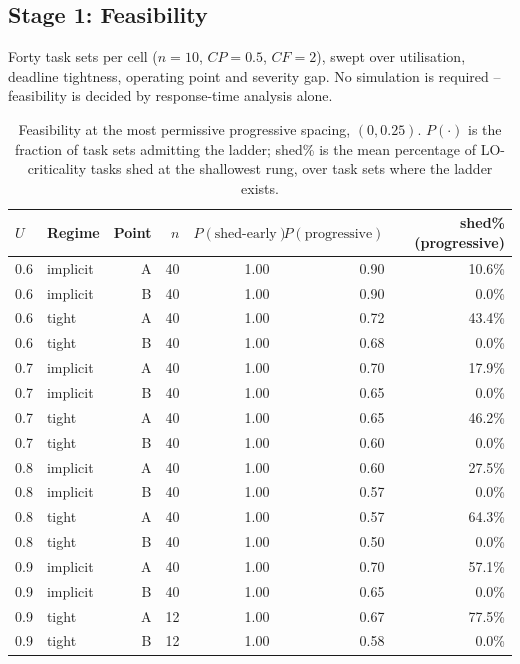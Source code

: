 \documentclass{article}
\begin{document}
\subsection{Stage 1: Feasibility}
\label{sec:feasibility-results}

Forty task sets per cell ($n=10$, $CP=0.5$, $CF=2$), swept over utilisation,
deadline tightness, operating point and severity gap. No simulation is
required -- feasibility is decided by response-time analysis alone.

\begin{table}[h]
\centering
\caption{Feasibility at the most permissive progressive spacing, $(0, 0.25)$.
$P(\cdot)$ is the fraction of task sets admitting the ladder; shed\% is the
mean percentage of LO-criticality tasks shed at the shallowest rung, over task
sets where the ladder exists.}
\label{tab:feasibility}
\begin{tabular}{llrrrrr}
\toprule
$U$ & Regime & Point & $n$ & $P(\text{shed-early})$ & $P(\text{progressive})$ & shed\%(progressive) \\
\midrule
0.6 & implicit & A & 40 & 1.00 & 0.90 & 10.6\% \\
0.6 & implicit & B & 40 & 1.00 & 0.90 & 0.0\% \\
0.6 & tight    & A & 40 & 1.00 & 0.72 & 43.4\% \\
0.6 & tight    & B & 40 & 1.00 & 0.68 & 0.0\% \\
0.7 & implicit & A & 40 & 1.00 & 0.70 & 17.9\% \\
0.7 & implicit & B & 40 & 1.00 & 0.65 & 0.0\% \\
0.7 & tight    & A & 40 & 1.00 & 0.65 & 46.2\% \\
0.7 & tight    & B & 40 & 1.00 & 0.60 & 0.0\% \\
0.8 & implicit & A & 40 & 1.00 & 0.60 & 27.5\% \\
0.8 & implicit & B & 40 & 1.00 & 0.57 & 0.0\% \\
0.8 & tight    & A & 40 & 1.00 & 0.57 & 64.3\% \\
0.8 & tight    & B & 40 & 1.00 & 0.50 & 0.0\% \\
0.9 & implicit & A & 40 & 1.00 & 0.70 & 57.1\% \\
0.9 & implicit & B & 40 & 1.00 & 0.65 & 0.0\% \\
0.9 & tight    & A & 12 & 1.00 & 0.67 & 77.5\% \\
0.9 & tight    & B & 12 & 1.00 & 0.58 & 0.0\% \\
\bottomrule
\end{tabular}
\end{table}
\end{document}
